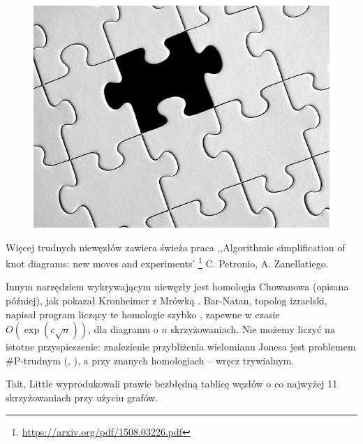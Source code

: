 \begin{figure}[H]
\begin{minipage}[b]{.32\linewidth}
		\includegraphics[width=\linewidth]{../data/missing.jpg}
	\end{minipage}
\end{figure}

Więcej trudnych niewęzłów zawiera świeża praca
,,Algorithmic simplification of knot diagrams: new moves and experiments'
\footnote{\url{https://arxiv.org/pdf/1508.03226.pdf}}
C. Petronio, A. Zanellatiego.

Innym narzędziem wykrywającym niewęzły jest homologia Chowanowa (opisana później),
jak pokazał Kronheimer z Mrówką \cite{kronheimer11}.
Bar-Natan, topolog izraelski, napisał program liczący te homologie szybko \cite{barnatan07},
zapewne w czasie $O(\exp(c \sqrt n))$, dla diagramu o $n$ skrzyżowaniach.
Nie możemy liczyć na istotne przyspieszenie:
znalezienie przybliżenia wielomianu Jonesa jest problemem \#P-trudnym (\cite{kuperberg15}, \cite{vertigan05}),
a przy znanych homologiach -- wręcz trywialnym.

Tait, Little wyprodukowali prawie bezbłędną tablicę węzłów o co najwyżej 11 skrzyżowaniach przy użyciu grafów.